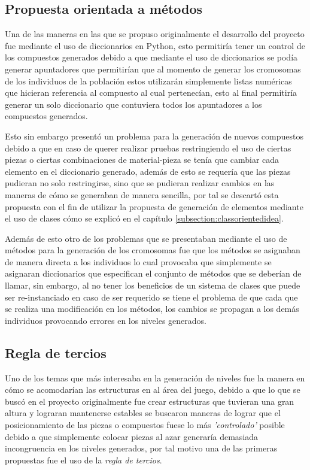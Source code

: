 \subsection{Propuesta orientada a métodos}
\label{subsection:objectorientedidea}

Una de las maneras en las que se propuso originalmente el desarrollo del proyecto
fue mediante el uso de diccionarios en Python, esto permitiría
tener un control de los compuestos generados debido a que mediante el uso de
diccionarios se podía generar apuntadores que permitirían que al momento de
generar los cromosomas de los individuos de la población estos utilizarán
simplemente listas numéricas que hicieran referencia al compuesto al cual
pertenecían, esto al final permitiría generar un solo diccionario que
contuviera todos los apuntadores a los compuestos generados.

Esto sin embargo presentó un problema para la generación de nuevos compuestos
debido a que en caso de querer realizar pruebas restringiendo el uso de ciertas
piezas o ciertas combinaciones de material-pieza se tenía que cambiar cada
elemento en el diccionario generado, además de esto se requería que las
piezas pudieran no solo restringirse, sino que se pudieran realizar cambios en
las maneras de cómo se generaban de manera sencilla, por tal se descartó esta
propuesta con el fin de utilizar la propuesta de generación de elementos
mediante el uso de clases cómo se explicó en el capítulo
\ref{subsection:classorientedidea}.

Además de esto otro de los problemas que se presentaban mediante el uso de
métodos para la generación de los cromosomas fue que los métodos se asignaban de
manera directa a los individuos lo cual provocaba que simplemente se asignaran
diccionarios que especifican el conjunto de métodos que se deberían de llamar,
sin embargo, al no tener los beneficios de un sistema de clases que puede ser
re-instanciado en caso de ser requerido se tiene el problema de que cada que se
realiza una modificación en los métodos, los cambios se propagan a los
demás individuos provocando errores en los niveles generados.


\subsection{Regla de tercios}
\label{subsection:ruleofthirds}

Uno de los temas que más interesaba en la generación de niveles fue la manera en
cómo se acomodarían las estructuras en al área del juego, debido a que lo que se
buscó en el proyecto originalmente fue crear estructuras que tuvieran una gran
altura y lograran mantenerse estables se buscaron maneras de lograr que el
posicionamiento de las piezas o compuestos fuese lo más \textit{'controlado'}
posible debido a que simplemente colocar piezas al azar generaría demasiada incongruencia
en los niveles generados, por tal motivo una de las primeras propuestas fue el
uso de la \textit{regla de tercios}.

